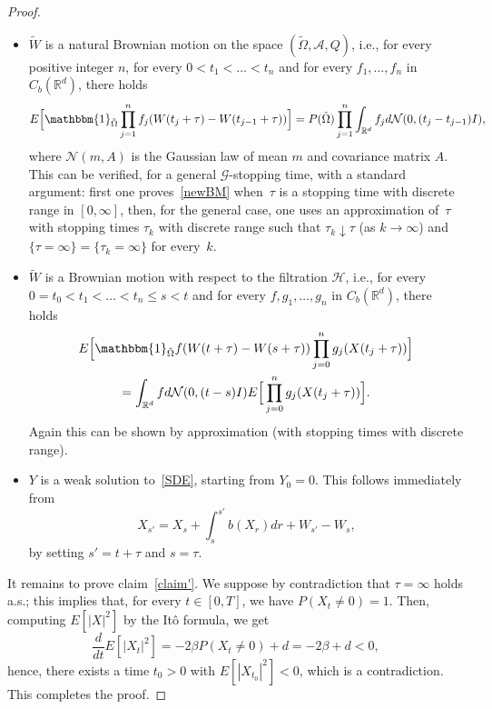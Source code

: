 \documentclass[a4paper,10pt]{article}
\newcommand\1{\mathbbm{1}}
\newcommand{\mc}{\mathcal}
\newcommand{\td}{\tilde}
\numberwithin{equation}{section}
\begin{document}
\begin{proof}
\begin{itemize}
  \item $\td{W}$ is a natural Brownian motion on the space $(\td{\Omega},\mc{A},Q)$, i.e., for every positive integer $n$, for every $0<t_1<\ldots < t_n$ and for every $f_1,\ldots, f_n$ in $C_b(\mathbb{R}^d)$, there holds 
  \begin{equation}
  E\Big[ \1_{\td{\Omega}}\prod^n_{j=1}f_j(W(t_j+\tau)-W(t_{j-1}+\tau))\Big]= P(\td{\Omega})\prod^n_{j=1}\int_{\mathbb{R}^d}f_jd\mc{N}(0,(t_j-t_{j-1})I),\label{newBM}
  \end{equation}
  where $\mc{N}(m,A)$ is the Gaussian law of mean $m$ and covariance matrix $A$. This can be verified, for a general $\mc{G}$-stopping time, with a standard argument: first one proves~\eqref{newBM} when~$\tau$ is a stopping time with discrete range in $[0,\infty]$, then, for the general case, one uses an approximation of~$\tau$ with stopping times $\tau_k$ with discrete range such that $\tau_k\downarrow\tau$ (as $k\rightarrow\infty$) and $\{\tau=\infty\}=\{\tau_k=\infty\}$ for every~$k$.
  \item $\td{W}$ is a Brownian motion with respect to the filtration $\mc{H}$, i.e., for every $0=t_0<t_1<\ldots < t_n\le s<t$ and for every $f,g_1,\ldots, g_n$ in $C_b(\mathbb{R}^d)$, there holds 
  \begin{multline*}
  E\Big[ \1_{\td{\Omega}}f(W(t+\tau)-W(s+\tau))\prod^n_{j=0}g_j(X(t_j+\tau))\Big] \\
  = \int_{\mathbb{R}^d}fd\mc{N}(0,(t-s)I)E\Big[\prod^n_{j=0}g_j(X(t_j+\tau))\Big].
  \end{multline*}
  Again this can be shown by approximation (with stopping times with discrete range).
  \item $Y$ is a weak solution to~\eqref{SDE}, starting from $Y_0 = 0$. This follows immediately from
  \begin{equation*}
  X_{s'}=X_s+\int^{s'}_sb(X_r)dr+W_{s'}-W_s ,
  \end{equation*}
  by setting $s'=t+\tau$ and $s=\tau$.
\end{itemize}

It remains to prove claim~\eqref{claim'}. We suppose by contradiction that $\tau=\infty$ holds a.s.; this implies that, for every $t \in [0,T]$, we have $P(X_t\neq0)=1$. Then, computing $E[|X|^2]$ by the It\^o formula, we get
\begin{equation*}
\frac{d}{dt}E[|X_t|^2]=-2\beta P(X_t\neq0)+d=-2\beta+d<0,
\end{equation*}
hence, there exists a time $t_0>0$ with $E[|X_{t_0}|^2]<0$, which is a contradiction. This completes the proof.
\end{proof}
\end{document}
